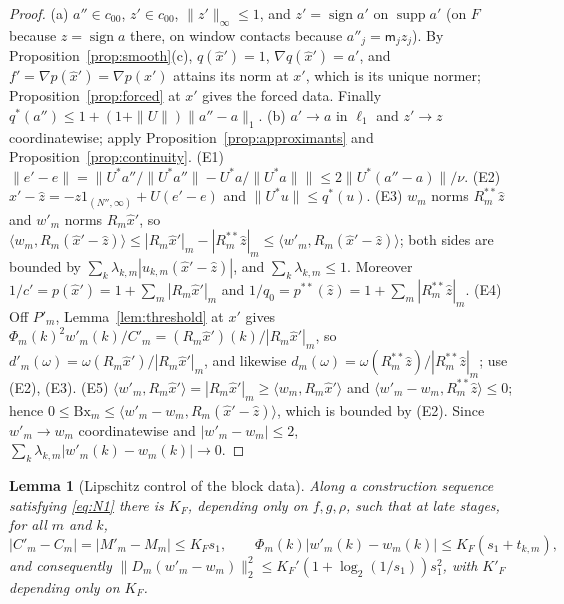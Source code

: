 \documentclass[10pt]{amsart}
\newtheorem{lemma}[theorem]{Lemma}
\theoremstyle{definition}
\theoremstyle{remark}
\newcommand{\supp}{\operatorname{supp}}
\newcommand{\sgn}{\operatorname{sign}}
\newcommand{\zh}{\hat z}
\newcommand{\ip}[2]{\langle #1,#2\rangle}
\begin{document}
\begin{proof}
(a) $a''\in c_{00}$, $z'\in c_{00}$, $\|z'\|_\infty\le1$, and $z'=\sgn a'$ on
$\supp a'$ (on $F$ because $z=\sgn a$ there, on window contacts because
$a''_j=\mathsf m_jz_j$).  By Proposition~\ref{prop:smooth}(c), $q(\hat x')=1$,
$\nabla q(\hat x')=a'$, and $f'=\nabla p(\hat x')=\nabla p(x')$ attains its
norm at $x'$, which is its unique normer; Proposition~\ref{prop:forced} at
$x'$ gives the forced data.  Finally $q^*(a'')\le1+(1+\|U\|)\|a''-a\|_1$.
(b) $a'\to a$ in $\ell_1$ and $z'\to z$ coordinatewise; apply
Proposition~\ref{prop:approximants} and Proposition~\ref{prop:continuity}.
(E1) $\|e'-e\|=\|U^*a''/\|U^*a''\|-U^*a/\|U^*a\|\|\le2\|U^*(a''-a)\|/\nu$.
(E2) $\hat x'-\zh=-z1_{(N'',\infty)}+U(e'-e)$ and $\|U^*u\|\le q^*(u)$.
(E3) $w_m$ norms $R_m^{**}\zh$ and $w'_m$ norms $R_m\hat x'$, so
$\ip{w_m}{R_m(\hat x'-\zh)}\le|R_m\hat x'|_m-|R^{**}_m\zh|_m\le
\ip{w'_m}{R_m(\hat x'-\zh)}$; both sides are bounded by
$\sum_k\lambda_{k,m}|u_{k,m}(\hat x'-\zh)|$, and $\sum_k\lambda_{k,m}\le1$.
Moreover $1/c'=p(\hat x')=1+\sum_m|R_m\hat x'|_m$ and $1/q_0=p^{**}(\zh)=
1+\sum_m|R^{**}_m\zh|_m$.
(E4) Off $P'_m$, Lemma~\ref{lem:threshold} at $x'$ gives
$\Phi_m(k)^2w'_m(k)/C'_m=(R_m\hat x')(k)/|R_m\hat x'|_m$, so
$d'_m(\omega)=\omega(R_m\hat x')/|R_m\hat x'|_m$, and likewise
$d_m(\omega)=\omega(R^{**}_m\zh)/|R^{**}_m\zh|_m$; use (E2), (E3).
(E5) $\ip{w'_m}{R_m\hat x'}=|R_m\hat x'|_m\ge\ip{w_m}{R_m\hat x'}$ and
$\ip{w'_m-w_m}{R_m^{**}\zh}\le0$; hence $0\le\mathrm{Bx}_m\le
\ip{w'_m-w_m}{R_m(\hat x'-\zh)}$, which is bounded by (E2).  Since
$w'_m\to w_m$ coordinatewise and $|w'_m-w_m|\le2$,
$\sum_k\lambda_{k,m}|w'_m(k)-w_m(k)|\to0$.
\end{proof}

\begin{lemma}[Lipschitz control of the block data]\label{lem:F1}
Along a construction sequence satisfying \eqref{eq:N1} there is $K_F$,
depending only on $f,g,\rho$, such that at late stages, for all $m$ and $k$,
\[
 |C'_m-C_m|=|M'_m-M_m|\le K_Fs_1,\qquad
 \Phi_m(k)|w'_m(k)-w_m(k)|\le K_F(s_1+t_{k,m}),
\]
and consequently $\|D_m(w'_m-w_m)\|_2^2\le K_F'(1+\log_2(1/s_1))s_1^2$, with
$K'_F$ depending only on $K_F$.
\end{lemma}
\end{document}
